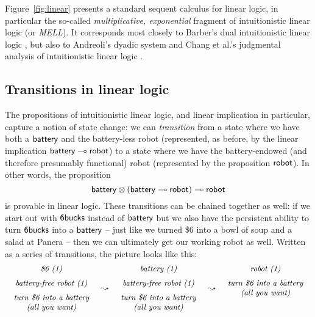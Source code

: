 

Figure~\ref{fig:linear} presents a standard sequent calculus for
linear logic, in particular the so-called {\it multiplicative,
  exponential} fragment of intuitionistic linear logic (or {\it
  MELL}). It corresponds most closely to Barber's dual intuitionistic
linear logic \cite{barber96dual}, but also to Andreoli's dyadic system
\cite{andreoli92logic} and Chang et al.'s judgmental analysis of
intuitionistic linear logic \cite{chang03judgmental}.

\subsection{Transitions in linear logic}

The propositions of intuitionistic linear logic, and linear implication
in particular, capture a notion of state change: we can {\it
  transition} from a state where we have both a ${\sf battery}$ and
the battery-less robot (represented, as before, by the linear
implication ${\sf battery} \multimap {\sf robot}$) to a state where we
have the battery-endowed (and therefore presumably functional) robot
(represented by the proposition ${\sf robot}$). In other words, the
proposition
%
\[{\sf battery} \otimes ({\sf battery} \multimap {\sf robot}) \multimap
{\sf robot}\] 
%
is provable in linear logic. These transitions can be chained
together as well: if we start out with ${\sf
  6bucks}$ instead of ${\sf battery}$ but we also have the
persistent ability to turn ${\sf 6bucks}$ into a ${\sf battery}$ --
just like we turned \$6 into a bowl of soup and a salad at Panera --
then we can ultimately get our working robot as well.
Written as a series of transitions, the picture looks like this:
\[
\begin{array}{ccccc}
\begin{array}{c}
\mbox{\it \$6 (1)}\medskip\\ 
\mbox{\it battery-free robot (1)} \medskip\\ 
\mbox{\it turn \$6 into a battery}\\
\mbox{\it (all you want)}
\end{array}
& \leadsto &
\begin{array}{c}
\mbox{\it battery  (1)}\medskip\\ 
\mbox{\it battery-free robot (1)} \medskip\\ 
\mbox{\it turn \$6 into a battery}\\
\mbox{\it (all you want)}
\end{array}
& \leadsto &
\begin{array}{c}
\mbox{\it robot (1)} \medskip\\ 
\mbox{\it turn \$6 into a battery}\\
\mbox{\it (all you want)}\medskip\\~\\
\end{array}
\end{array}
\]
